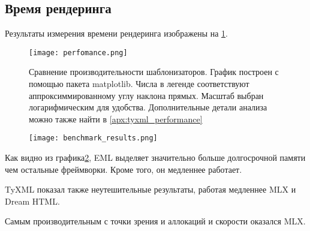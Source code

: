 \subsection{Время рендеринга}

Результаты измерения времени рендеринга изображены на \ref{fig:perfomance}.

\begin{figure}[h!]
    \texttt{[image: perfomance.png]}
    \caption{Сравнение производительности шаблонизаторов. График построен с помощью пакета matplotlib. Числа в легенде соответствуют аппроксиммированному углу наклона прямых. Масштаб выбран логарифмическим для удобства. Дополнительные детали анализа можно также найти в \ref{apx:tyxml_performance}}
    \label{fig:perfomance}
\end{figure}

\begin{figure}[h!]
    \texttt{[image: benchmark\_results.png]}
    \caption{}
    \label{fig:bench-performance}
\end{figure}

Как видно из графика\ref{fig:bench-performance}, EML выделяет значительно больше долгосрочной памяти чем остальные фреймворки.
Кроме того, он медленнее работает.

TyXML показал также неутешительные результаты, работая медленнее MLX и Dream HTML.

Самым производительным с точки зрения и аллокаций и скорости оказался MLX.


